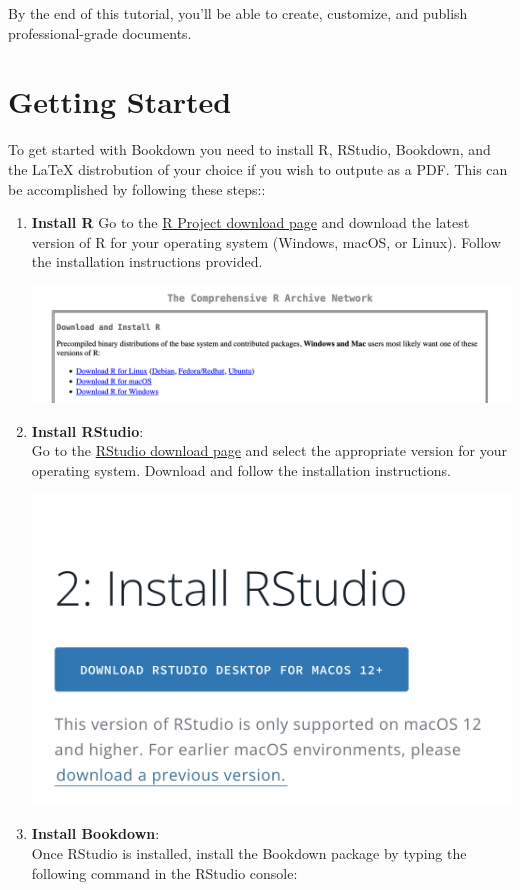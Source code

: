 \documentclass[
]{book}
\theoremstyle{definition}
\theoremstyle{definition}
\theoremstyle{definition}
\theoremstyle{definition}
\theoremstyle{remark}
\begin{document}
By the end of this tutorial, you'll be able to create, customize, and publish professional-grade documents.

\section{Getting Started}\label{getting-started}

To get started with Bookdown you need to install R, RStudio, Bookdown, and the LaTeX distrobution of your choice if you wish to outpute as a PDF. This can be accomplished by following these steps::

\begin{enumerate}
\def\labelenumi{\arabic{enumi}.}
\item
  \textbf{Install R}
  Go to the \href{https://cran.r-project.org/}{R Project download page} and download the latest version of R for your operating system (Windows, macOS, or Linux). Follow the installation instructions provided.

  \includegraphics{images/tutorialscreenshots/installR.png}
\item
  \textbf{Install RStudio}:\\
  Go to the \href{https://posit.co/download/rstudio-desktop/}{RStudio download page} and select the appropriate version for your operating system. Download and follow the installation instructions.

  \includegraphics{images/tutorialscreenshots/installRStudio.png}
\item
  \textbf{Install Bookdown}:\\
  Once RStudio is installed, install the Bookdown package by typing the following command in the RStudio console:


\end{enumerate}
\end{document}
